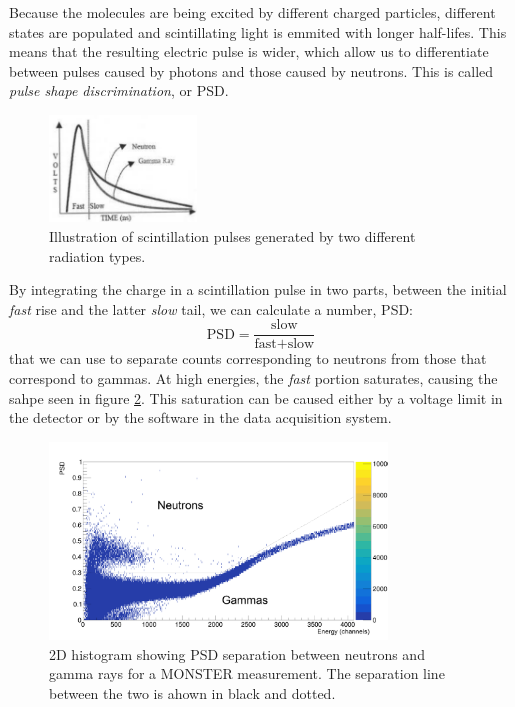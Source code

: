 \documentclass[a4paper,12pt]{report}
\begin{document}
Because the molecules are being excited by different charged particles, different states are populated and scintillating light is emmited with longer half-lifes.
This means that the resulting electric pulse is wider, which allow us to differentiate between pulses caused by photons and those caused by neutrons.
This is called \textit{pulse shape discrimination}, or PSD.

\begin{figure}[H]
	\centering
	\includegraphics[width=0.35\textwidth]{psd_explanation.png}
	\caption{Illustration of scintillation pulses generated by two different radiation types.}	%
	\label{psd_explanation}
\end{figure}

By integrating the charge in a scintillation pulse in two parts, between the initial \textit{fast} rise and the latter \textit{slow} tail, we can calculate a number, PSD:
\begin{equation}
	\text{PSD} = \frac{\text{slow}}{\text{fast}+\text{slow}}	%
\end{equation}
that we can use to separate counts corresponding to neutrons from those that correspond to gammas.
At high energies, the \textit{fast} portion saturates, causing the sahpe seen in figure \ref{example_psd}.
This saturation can be caused either by a voltage limit in the detector or by the software in the data acquisition system.

\begin{figure}[H]
	\centering
	\includegraphics[width=0.80\textwidth]{example_psd.png}
	\caption{2D histogram showing PSD separation between neutrons and gamma rays for a MONSTER measurement.
	The separation line between the two is ahown in black and dotted.}
	\label{example_psd}
\end{figure}
\end{document}
